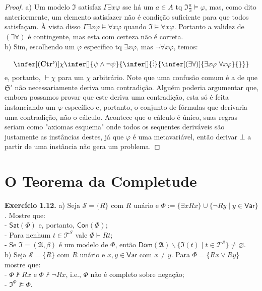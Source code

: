 \documentclass[11pt]{article}
\theoremstyle{definition}
\newcommand{\mc}[1]{\mathcal{#1}}
\newcommand{\mf}[1]{\mathfrak{#1}}
\newcommand{\msf}[1]{\mathsf{#1}}
\begin{document}
\begin{proof}
    a) Um modelo $\mf{I}$ satisfaz $\Gamma\exists x\varphi$ sse há um $a\in A$ tq $\mf{I}\frac{a}{x}\vDash\varphi$, mas, como dito anteriormente, um elemento satisfazer não é condição suficiente para que todos satisfaçam. À vista disso $\Gamma\exists x\varphi\vDash\forall x\varphi$ quando $\mf{I}\vDash\forall x\varphi$. Portanto a validez de $(\exists\forall)$ é contingente, mas esta com certeza não é correta.\\
    b) Sim, escolhendo um $\varphi$ específico tq $\exists x\varphi$, mas $\neg\forall x\varphi$, temos:
    $$\infer[(\textbf{Ctr'})]{\chi}{\infer[]{\psi\wedge\neg\psi}{\infer[]{\vdots}{\infer[(\exists\forall)]{\exists x\varphi~\forall x\varphi}{}}}}$$
    e, portanto, $\vdash\chi$ para um $\chi$ arbitrário. Note que uma confusão comum é a de que $\mf{S}'$ não necessariamente deriva uma contradição. Alguém poderia argumentar que, embora possamos provar que este deriva uma contradição, esta só é feita instanciando um $\varphi$ específico e, portanto, o conjunto de fórmulas que derivaria uma contradição, não o cálculo. Acontece que o cálculo é único, suas regras seriam como "axiomas esquema" onde todos os sequentes deriváveis são justamente as instâncias destes, já que $\varphi$ é uma metavariável, então derivar $\bot$ a partir de uma instância não gera um problema.
\end{proof}

\section{O Teorema da Completude}

\textbf{Exercício 1.12.} a) Seja $\mc{S}=\{R\}$ com $R$ unário e $\Phi:=\{\exists xRx\}\cup\{\neg Ry\mid y\in\msf{Var}\}$. Mostre que:\\
- $\msf{Sat}(\Phi)$ e, portanto, $\msf{Con}(\Phi)$;\\
- Para nenhum $t\in\mc{T}^\mc{S}$ vale $\Phi\vdash Rt$;\\
- Se $\mf{I}=(\mf{A},\beta)$ é um modelo de $\Phi$, então $\msf{Dom}(\mf{A})\backslash\{\mf{I}(t)\mid t\in\mc{T}^\mc{S}\}\ne\varnothing$.\\
b) Seja $\mc{S}=\{R\}$ com $R$ unário e $x,y\in\msf{Var}$ com $x\ne y$. Para $\Phi=\{Rx\vee Ry\}$ mostre que:\\
- $\Phi\nvdash Rx$ e $\Phi\nvdash\neg Rx$, i.e., $\Phi$ não é completo sobre negação;\\
- $\mf{I}^\Phi\nvDash\Phi$.\\
\end{document}
